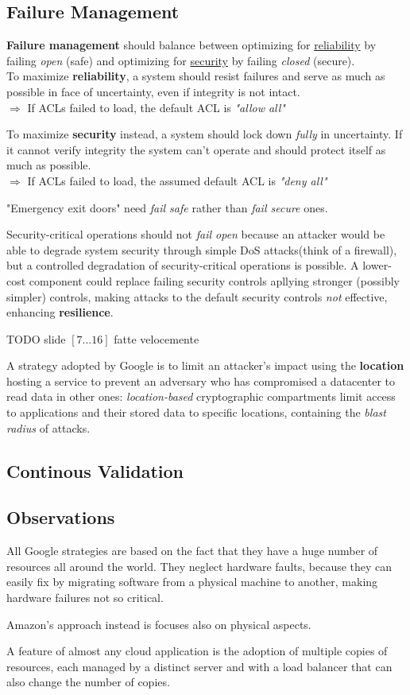 \subsection{Failure Management}
\textbf{Failure management} should balance between optimizing for \underline{reliability} by failing
\textit{open} (safe) and optimizing for \underline{security} by failing \textit{closed} (secure).\\
To maximize \textbf{reliability}, a system should resist failures and serve as much as possible in face of uncertainty, even if integrity is not intact.\\
$\Longrightarrow$ If ACLs failed to load, the default ACL is \textit{"allow all"}

To maximize \textbf{security} instead, a system should lock down \textit{fully} in uncertainty.
If it cannot verify integrity the system can’t operate and should protect itself as much as possible.\\
$\Longrightarrow$ If ACLs failed to load, the assumed default ACL is \textit{"deny all"}
\begin{center}
   "Emergency exit doors" need \textit{fail safe} rather than \textit{fail secure} ones.
\end{center}

Security-critical operations should not \textit{fail open} because an attacker would be able to degrade system security through simple DoS attacks(think of a firewall),
but a controlled degradation of security-critical operations is possible.
A lower-cost component could replace failing security controls apllying stronger (possibly simpler) controls, making attacks to the default security controls \textit{not} effective, enhancing \textbf{resilience}.

TODO slide $[7...16]$ fatte velocemente
\nl

A strategy adopted by Google is to limit an attacker’s impact using the \textbf{location} hosting a service to prevent
an adversary who has compromised a datacenter to read data in other ones:
\textit{location-based} cryptographic compartments limit access to applications and
their stored data to specific locations, containing the \textit{blast radius} of attacks.



\subsection{Continous Validation}

\subsection{Observations}
All Google strategies are based on the fact that they have a huge number of resources all around the world.
They neglect hardware faults,
because they can easily fix by migrating software from a physical machine to another,
making hardware failures not so critical.

Amazon's approach instead is focuses also on physical aspects.

A feature of almost any cloud application is the adoption of multiple copies of resources, each managed by a distinct server and with a load balancer that can also change the number of copies.


